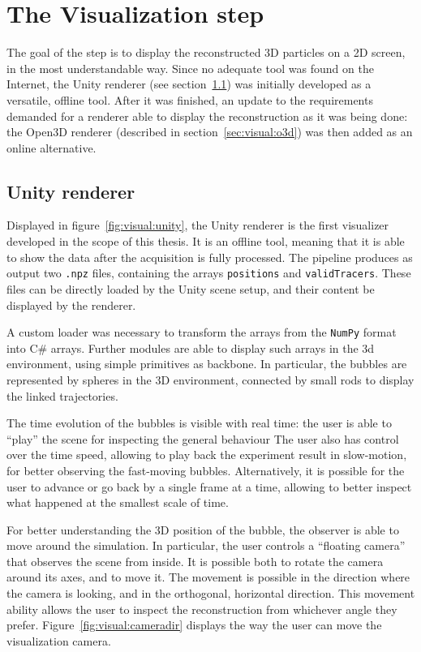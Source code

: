 \chapter{The Visualization step}
\label{chap:visual}

The goal of the \visual* step is to display the reconstructed 3D particles on a 2D screen, in the most understandable way.
Since no adequate tool was found on the Internet, the Unity renderer (see section~\ref{sec:visual:unity}) was initially developed as a versatile, offline tool.
After it was finished, an update to the requirements demanded for a renderer able to display the reconstruction as it was being done: the Open3D renderer (described in section~\ref{sec:visual:o3d}) was then added as an online alternative.

\section{Unity renderer}
\label{sec:visual:unity}

Displayed in figure~\ref{fig:visual:unity}, the Unity renderer is the first visualizer developed in the scope of this thesis.
It is an offline tool, meaning that it is able to show the data after the acquisition is fully processed.
The pipeline produces as output two \texttt{.npz} files, containing the arrays \texttt{positions} and \texttt{validTracers}.
These files can be directly loaded by the Unity scene setup, and their content be displayed by the renderer.

A custom loader was necessary to transform the arrays from the \texttt{NumPy} format into C\# arrays.
Further modules are able to display such arrays in the 3d environment, using simple primitives as backbone.
In particular, the bubbles are represented by spheres in the 3D environment, connected by small rods to display the linked trajectories.

The time evolution of the bubbles is visible with real time: the user is able to ``play'' the scene for inspecting the general behaviour
The user also has control over the time speed, allowing to play back the experiment result in slow-motion, for better observing the fast-moving bubbles.
Alternatively, it is possible for the user to advance or go back by a single frame at a time, allowing to better inspect what happened at the smallest scale of time.

For better understanding the 3D position of the bubble, the observer is able to move around the simulation.
In particular, the user controls a ``floating camera'' that observes the scene from inside.
It is possible both to rotate the camera around its axes, and to move it.
The movement is possible in the direction where the camera is looking, and in the orthogonal, horizontal direction.
This movement ability allows the user to inspect the reconstruction from whichever angle they prefer.
Figure~\ref{fig:visual:cameradir} displays the way the user can move the visualization camera.

